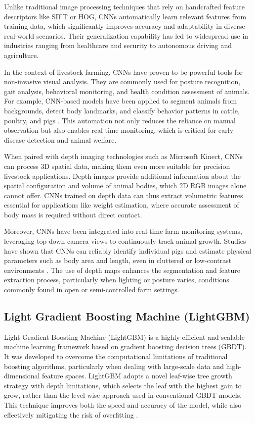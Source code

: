 {Unlike traditional image processing techniques that rely on handcrafted feature descriptors like SIFT or HOG, CNNs automatically learn relevant features from training data, which significantly improves accuracy and adaptability in diverse real-world scenarios. Their generalization capability has led to widespread use in industries ranging from healthcare and security to autonomous driving and agriculture.

In the context of livestock farming, CNNs have proven to be powerful tools for non-invasive visual analysis. They are commonly used for posture recognition, gait analysis, behavioral monitoring, and health condition assessment of animals. For example, CNN-based models have been applied to segment animals from backgrounds, detect body landmarks, and classify behavior patterns in cattle, poultry, and pigs \citep{andrasi2023pig_weight, wang2021deep_learning_farming}. This automation not only reduces the reliance on manual observation but also enables real-time monitoring, which is critical for early disease detection and animal welfare.

When paired with depth imaging technologies such as Microsoft Kinect, CNNs can process 3D spatial data, making them even more suitable for precision livestock applications. Depth images provide additional information about the spatial configuration and volume of animal bodies, which 2D RGB images alone cannot offer. CNNs trained on depth data can thus extract volumetric features essential for applications like weight estimation, where accurate assessment of body mass is required without direct contact.

Moreover, CNNs have been integrated into real-time farm monitoring systems, leveraging top-down camera views to continuously track animal growth. Studies have shown that CNNs can reliably identify individual pigs and estimate physical parameters such as body area and length, even in cluttered or low-contrast environments \citep{pinto2024pig_weights}. The use of depth maps enhances the segmentation and feature extraction process, particularly when lighting or posture varies, conditions commonly found in open or semi-controlled farm settings.

\subsection{Light Gradient Boosting Machine (LightGBM)}

Light Gradient Boosting Machine (LightGBM) is a highly efficient and scalable machine learning framework based on gradient boosting decision trees (GBDT). It was developed to overcome the computational limitations of traditional boosting algorithms, particularly when dealing with large-scale data and high-dimensional feature spaces. LightGBM adopts a novel leaf-wise tree growth strategy with depth limitations, which selects the leaf with the highest gain to grow, rather than the level-wise approach used in conventional GBDT models. This technique improves both the speed and accuracy of the model, while also effectively mitigating the risk of overfitting \citep{ke2017lightgbm}.

}
